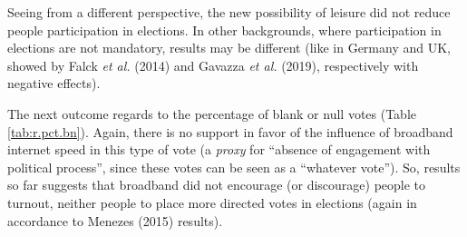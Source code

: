 \documentclass[
  12pt,
]{article}
\begin{document}
Seeing from a different perspective, the new possibility of leisure did
not reduce people participation in elections. In other backgrounds,
where participation in elections are not mandatory, results may be
different (like in Germany and UK, showed by Falck \emph{et al.} (2014)
and Gavazza \emph{et al.} (2019), respectively with negative effects).

The next outcome regards to the percentage of blank or null votes (Table
\ref{tab:r.pct.bn}). Again, there is no support in favor of the
influence of broadband internet speed in this type of vote (a
\emph{proxy} for ``absence of engagement with political process'', since
these votes can be seen as a ``whatever vote''). So, results so far
suggests that broadband did not encourage (or discourage) people to
turnout, neither people to place more directed votes in elections (again
in accordance to Menezes (2015) results).
\end{document}
